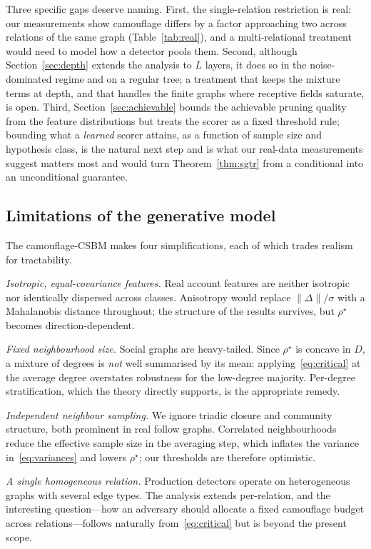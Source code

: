 \documentclass[onecolumn,pdflatex,sn-basic,Numbered]{sn-jnl}
\theoremstyle{thmstyleone}
\theoremstyle{thmstylethree}
\begin{document}
Three specific gaps deserve naming. First, the single-relation restriction is real: our measurements show camouflage
differs by a factor approaching two across relations of the same graph
(Table~\ref{tab:real}), and a multi-relational treatment would need to model how a
detector pools them. Second, although Section~\ref{sec:depth} extends the analysis
to $L$ layers, it does so in the noise-dominated regime and on a regular tree; a
treatment that keeps the mixture terms at depth, and that handles the finite graphs
where receptive fields saturate, is open. Third, Section~\ref{sec:achievable} bounds
the achievable pruning quality from the feature distributions but treats the scorer
as a fixed threshold rule; bounding what a \emph{learned} scorer attains, as a
function of sample size and hypothesis class, is the natural next step and is what
our real-data measurements suggest matters most and would
turn Theorem~\ref{thm:sgtr} from a conditional into an unconditional guarantee.\subsection{Limitations of the generative model}
\label{sec:limitations}

The camouflage-CSBM makes four simplifications, each of which trades realism for
tractability.

\emph{Isotropic, equal-covariance features.} Real account features are neither
isotropic nor identically dispersed across classes. Anisotropy would replace
$\|\Delta\|/\sigma$ with a Mahalanobis distance throughout; the structure of the
results survives, but $\rho^\star$ becomes direction-dependent.

\emph{Fixed neighbourhood size.} Social graphs are heavy-tailed. Since $\rho^\star$
is concave in $D$, a mixture of degrees is \emph{not} well summarised by its mean:
applying~\eqref{eq:critical} at the average degree overstates robustness for the
low-degree majority. Per-degree stratification, which the theory directly supports,
is the appropriate remedy.

\emph{Independent neighbour sampling.} We ignore triadic closure and community
structure, both prominent in real follow graphs. Correlated neighbourhoods reduce
the effective sample size in the averaging step, which inflates the variance
in~\eqref{eq:variances} and lowers $\rho^\star$; our thresholds are therefore
optimistic.

\emph{A single homogeneous relation.} Production detectors operate on
heterogeneous graphs with several edge types. The analysis extends per-relation,
and the interesting question---how an adversary should allocate a fixed camouflage
budget across relations---follows naturally from~\eqref{eq:critical} but is beyond
the present scope.
\end{document}
